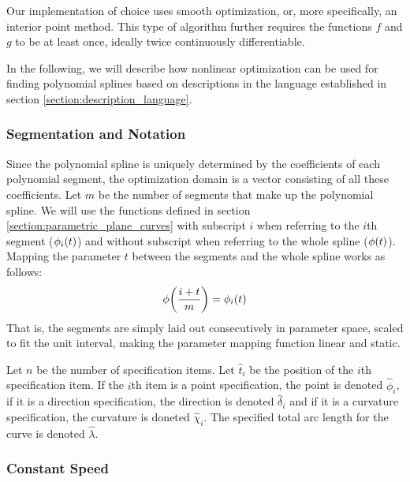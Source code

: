 \documentclass[a4paper]{article}
\begin{document}
				Our implementation of choice uses smooth optimization, or, more specifically, an interior point method. This type of algorithm further requires the functions \(f\) and \(g\) to be at least once, ideally twice continuously differentiable.

				In the following, we will describe how nonlinear optimization can be used for finding polynomial splines based on descriptions in the language established in section \ref{section:description_language}.

			\subsubsection{Segmentation and Notation}
			\label{section:segmentation_notation}


				Since the polynomial spline is uniquely determined by the coefficients of each polynomial segment, the optimization domain is a vector consisting of all these coefficients. Let \(m\) be the number of segments that make up the polynomial spline. We will use the functions defined in section \ref{section:parametric_plane_curves} with subscript \(i\) when referring to the \(i\)th segment (\(\phi_i\!\left( t \right)\)) and without subscript when referring to the whole spline (\(\phi\!\left( t \right)\)). Mapping the parameter \(t\) between the segments and the whole spline works as follows:
				\begin{equation*}
					\phi\!\left( \frac{i + t}{m} \right) = \phi_i\!\left( t \right)
				\end{equation*}
				That is, the segments are simply laid out consecutively in parameter space, scaled to fit the unit interval, making the parameter mapping function linear and static.

				Let \(n\) be the number of specification items. Let \(\hat{t}_i\) be the position of the \(i\)th specification item. If the \(i\)th item is a point specification, the point is denoted \(\hat{\phi}_i\), if it is a direction specification, the direction is denoted \(\hat{\delta}_i\) and if it is a curvature specification, the curvature is doneted \(\hat{\chi}_i\). The specified total arc length for the curve is denoted \(\hat{\lambda}\).

			\subsubsection{Constant Speed}
			\label{section:constant_speed}
\end{document}
